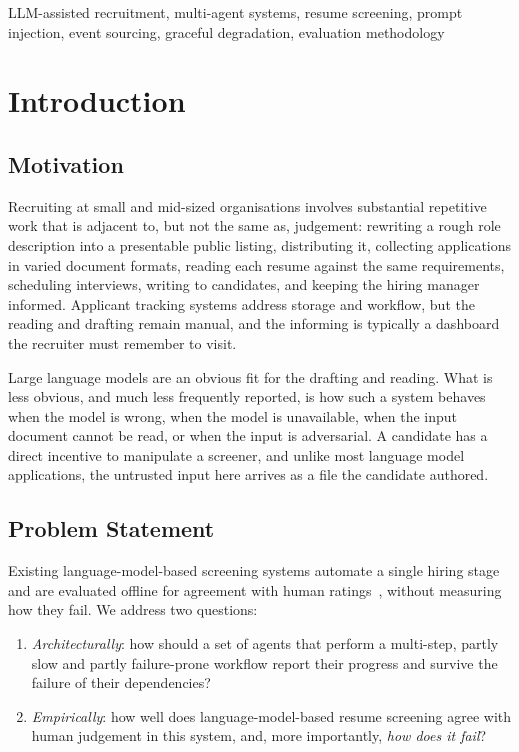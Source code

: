 \documentclass[conference]{IEEEtran}
\begin{document}
\begin{IEEEkeywords}
LLM-assisted recruitment, multi-agent systems, resume screening, prompt
injection, event sourcing, graceful degradation, evaluation methodology
\end{IEEEkeywords}

\section{Introduction}

\subsection{Motivation}

Recruiting at small and mid-sized organisations involves substantial repetitive
work that is adjacent to, but not the same as, judgement: rewriting a rough role
description into a presentable public listing, distributing it, collecting
applications in varied document formats, reading each resume against the same
requirements, scheduling interviews, writing to candidates, and keeping the
hiring manager informed. Applicant tracking systems address storage and
workflow, but the reading and drafting remain manual, and the informing is
typically a dashboard the recruiter must remember to visit.

Large language models are an obvious fit for the drafting and reading. What is
less obvious, and much less frequently reported, is how such a system behaves
when the model is wrong, when the model is unavailable, when the input document
cannot be read, or when the input is adversarial. A candidate has a direct
incentive to manipulate a screener, and unlike most language model
applications, the untrusted input here arrives as a file the candidate authored.

\subsection{Problem Statement}

Existing language-model-based screening systems automate a single hiring stage
and are evaluated offline for agreement with human ratings~\cite{b1,b2},
without measuring how they fail. We address two questions:

\begin{enumerate}
\item \textit{Architecturally}: how should a set of agents that perform a
multi-step, partly slow and partly failure-prone workflow report their progress
and survive the failure of their dependencies?
\item \textit{Empirically}: how well does language-model-based resume screening
agree with human judgement in this system, and, more importantly, \textit{how
does it fail}?
\end{enumerate}
\end{document}
